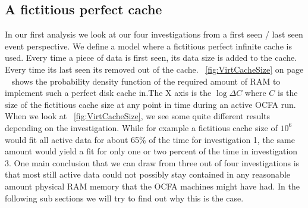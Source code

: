 \subsection{A fictitious perfect cache}
In our first analysis we look at our four investigations from a first seen / last seen event perspective. We define a model where a fictitious perfect infinite cache is used. Every time a piece of data is first seen, its data size is added to the cache. Every time its last seen its removed out of the cache. ~\ref{fig:VirtCacheSize} on page ~\pageref{fig:VirtCacheSize} shows the probability density function of the required amount of RAM to implement such a perfect disk cache in.The X axis is the $\log{\Delta C}$ where $C$ is the size of the fictitious cache size at any point in time during an active OCFA run. When we look at ~\ref{fig:VirtCacheSize}, we see some quite different results depending on the investigation. While for example a fictitious cache size of $10^6$ would fit all active data for about 65\% of the time for investigation 1, the same amount would yield a fit for only one or two percent of the time in investigation 3. One main conclusion that we can draw from three out of four investigations is that most still active data could not possibly stay contained in any reasonable amount physical RAM memory that the OCFA machines might have had. In the following sub sections we will try to find out why this is the case.

